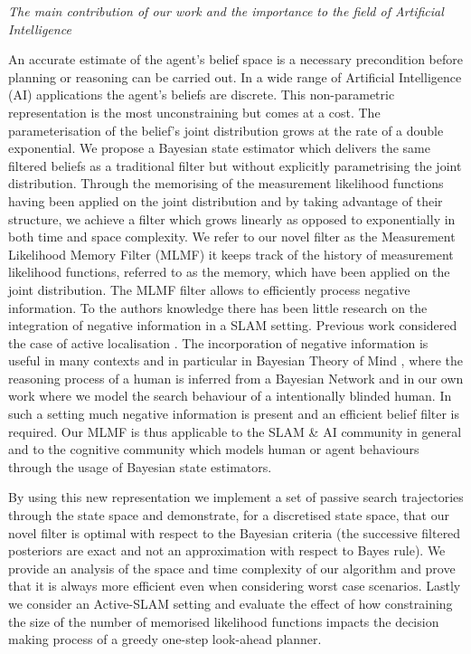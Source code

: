 \textit{The main contribution of our work and the importance to the field of Artificial Intelligence} 

An accurate estimate of the agent's belief space is a necessary precondition before planning or reasoning can be carried out.
In a wide range of Artificial Intelligence (AI) applications the agent's beliefs are discrete. This non-parametric representation
is the most unconstraining but comes at a cost. The parameterisation of the belief's joint distribution grows at the rate of a double exponential.
We propose a Bayesian state estimator which delivers the same filtered beliefs as a traditional filter but without explicitly parametrising the 
joint distribution. Through the memorising of the measurement likelihood functions having been applied on the joint distribution 
and by taking advantage of their structure, we achieve a filter which grows linearly as opposed to exponentially 
in both time and space complexity. We refer to our novel filter as the Measurement Likelihood Memory Filter (MLMF) 
it keeps track of the history of measurement likelihood functions, referred to as the memory, which 
have been applied on the joint distribution.
The MLMF filter allows to efficiently process negative information. To the authors knowledge there has been little
research on the integration of negative information in a SLAM setting. Previous work considered the case of active localisation \cite{NegInfoFurtherStudies}.
The incorporation of negative information is useful in many contexts and in particular in Bayesian Theory of Mind \cite{Bake_Saxe_Tene_2011},
where the reasoning process of a human is inferred from a Bayesian Network and in our own work \cite{deChambrier2013} where we model the 
search behaviour of a intentionally blinded human. In such a setting much negative information is present and an efficient belief filter is required. 
Our MLMF is thus applicable to the SLAM \& AI community in general and to the cognitive community which models human or agent behaviours through 
the usage of Bayesian state estimators.

By using this new representation we implement a set of passive search trajectories through the state 
space and demonstrate, for a discretised state space, that our novel filter is optimal with respect to the Bayesian criteria (the successive
filtered posteriors are exact and not an approximation with respect to Bayes rule). We provide an analysis of the space and time complexity of 
our algorithm and prove that it is always more efficient even when considering worst case scenarios.
Lastly we consider an Active-SLAM setting and evaluate the effect of how constraining the size of the number of memorised likelihood 
functions impacts the decision making process of a greedy one-step look-ahead planner.

